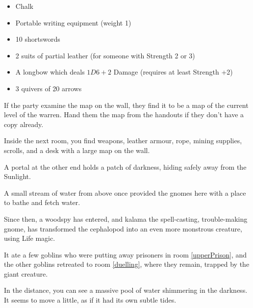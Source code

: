 \begin{multicols}{2}
\begin{itemize}
  \item
  Chalk
  \item
  Portable writing equipment (\gls{weight} 1)
  \item
  10 shortswords
  \item
  2 suits of partial leather (for someone with Strength 2 or 3)
    \iftoggle{hardcore}{%
    \item
    1 suit of partial leather (for someone with Strength 1 or 2)
  }{
    \item
    2 suits of partial chain (for someone with Strength 1 or 2)
  }
  \item
  A longbow which deals $1D6+2$ Damage (requires at least Strength +2)
  \item
  3 quivers of 20 arrows
\end{itemize}

If the party examine the map on the wall, they find it to be a map of the current level of the \gls{warren}.
Hand them the map from the handouts if they don't have a copy already.

\begin{boxtext}
  Inside the next room, you find weapons, leather armour, rope, mining supplies, scrolls, and a desk with a large map on the wall.

  A portal at the other end holds a patch of darkness, hiding safely away from the Sunlight.
\end{boxtext}

\null
{}

\begin{exampletext}

  A small stream of water from above once provided the gnomes here with a place to bathe and fetch water.

  Since then, a woodspy has entered, and \gls{kalama} the spell-casting, trouble-making gnome, has transformed the cephalopod into an even more monstrous creature, using Life magic.

  It ate a few goblins who were putting away prisoners in room \vref{upperPrison}, and the other goblins retreated to room \vref{duelling}, where they remain, trapped by the giant creature.

\end{exampletext}

\begin{boxtext}
  In the distance, you can see a massive pool of water shimmering in the darkness.
  It seems to move a little, as if it had its own subtle tides.


\end{boxtext}
\end{multicols}
